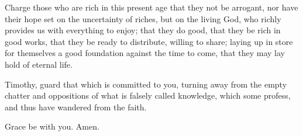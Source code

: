  Charge those who are rich in this present age that they
not be arrogant, nor have their hope set on the uncertainty of riches,
but on the living God, who richly provides us with everything to enjoy;
 that they do good, that they be rich in good works, that
they be ready to distribute, willing to share;  laying up
in store for themselves a good foundation against the time to come, that
they may lay hold of eternal life.

 Timothy, guard that which is committed to you, turning
away from the empty chatter and oppositions of what is falsely called
knowledge,  which some profess, and thus have wandered from
the faith.

Grace be with you. Amen.
